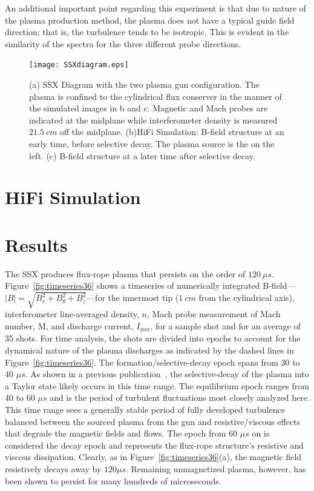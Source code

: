 \documentclass[12pt]{iopart}
\begin{document}
An additional important point regarding this experiment is that due to nature of the plasma production method, the plasma does not have a typical guide field direction; that is, the turbulence tends to be isotropic. This is evident in the similarity of the spectra for the three different probe directions.

\begin{figure}[!htbp]
\centerline{
\texttt{[image: SSXdiagram.eps]}}
\caption{\label{fig:SSXdiagram} (a) SSX Diagram with the two plasma gun configuration. The plasma is confined to the cylindrical flux conserver in the manner of the simulated images in b and c. Magnetic and Mach probes are indicated at the midplane while interferometer density is measured $21.5~cm$ off the midplane. (b)HiFi Simulation: B-field structure at an early time, before selective decay. The plasma source is the on the left. (c) B-field structure at a later time after selective decay.}
\end{figure}

\section{HiFi Simulation}

\section{Results}

The SSX produces flux-rope plasma that persists on the order of $120~\mu s$. Figure~\ref{fig:timeseries36} shows a timeseries of numerically integrated B-field---$|B|=\sqrt{B_{r}^{2}+B_{\theta}^{2}+B_{z}^{2}}$---for the innermost tip ($1~cm$ from the cylindrical axis), interferometer line-averaged density, $n$, Mach probe measurement of Mach number, M, and discharge current, $I_{gun}$, for a sample shot and for an average of 35 shots. For time analysis, the shots are divided into epochs to account for the dynamical nature of the plasma discharges as indicated by the dashed lines in Figure~\ref{fig:timeseries36}. The formation/selective-decay epoch spans from 30 to 40 $\mu s$. As shown in a previous publication~\cite{Gray13}, the selective-decay of the plasma into a Taylor state likely occurs in this time range. The equilibrium epoch ranges from 40 to 60 $\mu s$ and is the period of turbulent fluctuations most closely analyzed here. This time range sees a generally stable period of fully developed turbulence balanced between the sourced plasma from the gun and resistive/viscous effects that degrade the magnetic fields and flows. The epoch from 60 $\mu s$ on is considered the decay epoch and represents the flux-rope structure's resistive and viscous dissipation. Clearly, as in Figure~\ref{fig:timeseries36}(a), the magnetic field resistively decays away by $120 \mu s$. Remaining unmagnetized plasma, however, has been shown to persist for many hundreds of microseconds.
\end{document}
